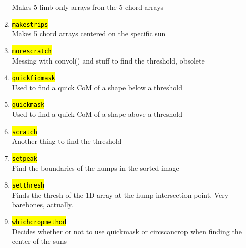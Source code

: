 \documentclass[10pt]{scrartcl}
\begin{document}
\begin{enumerate}
		Makes 5 limb-only arrays fron the 5 chord arrays
	\item \hl{\texttt{makestrips}}\\
		Makes 5 chord arrays centered on the specific sun
	\item \hl{\texttt{morescratch}}\\
		Messing with convol() and stuff to find the threshold, obsolete
	\item \hl{\texttt{quickfidmask}}\\
		Used to find a quick CoM of a shape below a threshold
	\item \hl{\texttt{quickmask}}\\
		Used to find a quick CoM of a shape above a threshold
	\item \hl{\texttt{scratch}}\\
		Another thing to find the threshold
	\item \hl{\texttt{setpeak}}\\
		Find the boundaries of the humps in the sorted image 
	\item \hl{\texttt{setthresh}}\\
		Finds the thresh of the 1D array at the hump intersection point. Very barebones, actually.
	\item \hl{\texttt{whichcropmethod}}\\
		Decides whether or not to use quickmask or circscancrop when finding the center of the suns
\end{enumerate}


\end{document}
